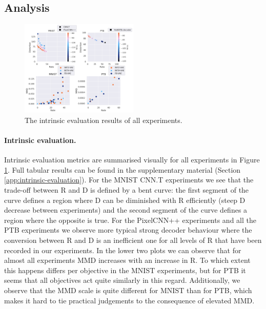 

\subsection{Analysis}

\begin{figure}
    \centering
    \includegraphics[width=0.5\textwidth]{images/intrinsic_evaluation.png}
    \caption{The intrinsic evaluation results of all experiments.}
    \label{fig:intrinsic-evaluation-plot}
\end{figure}

\paragraph{Intrinsic evaluation.}
Intrinsic evaluation metrics are summarised visually for all experiments in Figure \ref{fig:intrinsic-evaluation-plot}. Full tabular results can be found in the supplementary material (Section \ref{app:intrinsic-evaluation}). For the MNIST CNN.T experiments we see that the trade-off between R and D is defined by a bent curve: the first segment of the curve defines a region where D can be diminished with R efficiently (steep D decrease between experiments) and the second segment of the curve defines a region where the opposite is true. For the PixelCNN++ experiments and all the PTB experiments we observe more typical strong decoder behaviour where the conversion between R and D is an inefficient one for all levels of R that have been recorded in our experiments. In the lower two plots we can observe that for almost all experiments MMD increases with an increase in R. To which extent this happens differs per objective in the MNIST experiments, but for PTB it seems that all objectives act quite similarly in this regard. Additionally, we observe that the MMD scale is quite different for MNIST than for PTB, which makes it hard to tie practical judgements to the consequence of elevated MMD.

